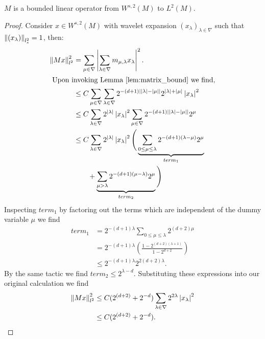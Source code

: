 \begin{lemma} \label{lem:M_bound}
	$M$ is a bounded linear operator from $W^{s,2}(M)$ to $L^2(M)$.
\end{lemma}
\begin{proof}
	Consider $x \in W^{s,2}(M)$ with wavelet expansion $(x_\lambda)_{\lambda \in \nabla}$ such that $\left\| (x_\lambda) \right\|_{l_s^2} = 1$, then:
	\begin{align*}
		\left\| Mx \right\|_{l^2}^2   &=    \sum_{\mu \in \nabla} \left|  \sum_{\lambda \in \nabla} m_{\mu,\lambda} x_{\lambda}  \right|^2. \\
		\intertext{ Upon invoking Lemma \ref{lem:matrix_bound} we find,}
							&\leq C\sum_{\mu \in \nabla} \sum_{\lambda \in \nabla} 2^{-(d+1)\left| {\lvert\lambda\rvert} - {\lvert\mu\rvert} \right|} 2^{{\lvert\lambda\rvert}+{\lvert\mu\rvert}} \left| x_\lambda \right|^2 \\
							&\leq C\sum_{\lambda \in \nabla} 2^{{\lvert\lambda\rvert}} \left| x_\lambda \right|^2 \sum_{\mu \in \nabla} 2^{-(d+1)\left| {\lvert\lambda\rvert}-{\lvert\mu\rvert} \right|}2^\mu \\
							&\leq C\sum_{\lambda \in \nabla}  2^{{\lvert\lambda\rvert}} \left| x_\lambda \right|^2 \Bigg( \underbrace{\sum_{0\leq\mu\leq\lambda} 2^{-(d+1)(\lambda - \mu)}2^{\mu}}_{term_1} \\
							&\qquad  + \underbrace{\sum_{\mu > \lambda} 2^{-(d+1)(\mu-\lambda)}2^{\mu} }_{term_2} \Bigg) \label{eq:terms}
		\end{align*}
		Inspecting $term_1$ by factoring out the terms which are independent of the dummy variable $\mu$ we find
		\begin{align*}
			term_1 &= 2^{-(d+1) \lambda }\sum_{0\leq\mu\leq\lambda} 2^{(d+2) \mu} \\
			&= 2^{-(d+1) \lambda} \left(  \frac{ 1-2^{(d+2)(\lambda + 1)} }{1 - 2^{d+2} } \right) \\
			&\leq 2^{-(d+1) \lambda} 2^{2(d+2)\lambda}.
		\end{align*}
		By the same tactic we find $term_2 \leq 2^{\lambda - d}$.  Substituting these expressions into our original calculation we find
		\begin{align*}	
			\left\| Mx \right\|_{l^2}^2 	&\leq C(2^{(d+2)}+2^{-d}) \sum_{\lambda \in \nabla} 2^{2\lambda} \left| x_{\lambda} \right|^2 \\
							&\leq C(2^{(d+2)}+2^{-d}).
		\end{align*}
\end{proof}

